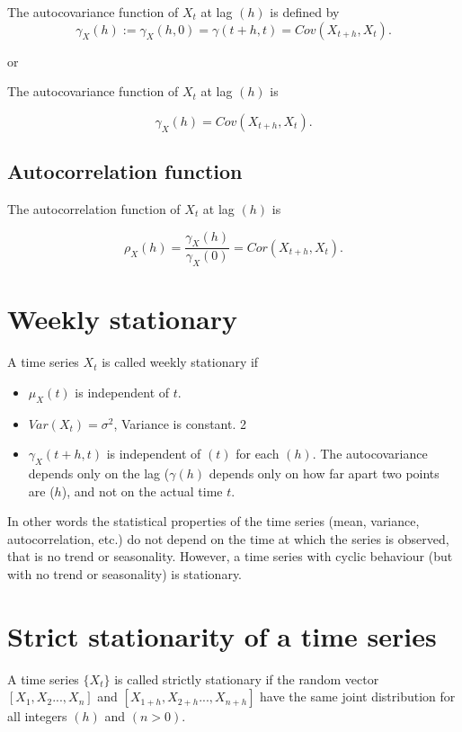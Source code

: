 \documentclass[
  11pt,
  a4paper,
]{report}
\begin{document}
The autocovariance function of \({X_t}\) at lag \((h)\) is defined by
\[\gamma_X(h):=\gamma_X(h, 0)=\gamma(t+h, t)=Cov(X_{t+h}, X_t).\]

or

The autocovariance function of \({X_t}\) at lag \((h)\) is

\[\gamma_X(h)=Cov(X_{t+h}, X_t).\]

\subsection{Autocorrelation function}\label{autocorrelation-function}

The autocorrelation function of \({X_t}\) at lag \((h)\) is

\[\rho_X(h)=\frac{\gamma_X(h)}{\gamma_X(0)}=Cor(X_{t+h}, X_t).\]

\section{Weekly stationary}\label{weekly-stationary}

A time series \({X_t}\) is called weekly stationary if

\begin{itemize}
\item
  \(\mu_X(t)\) is independent of \(t\).
\item
  \(Var(X_t) = \sigma^2\), Variance is constant. 2
\item
  \(\gamma_X(t+h, t)\) is independent of \((t)\) for each \((h)\). The
  autocovariance depends only on the lag (\(\gamma(h)\) depends only on
  how far apart two points are (\(h\)), and not on the actual time
  \(t\).
\end{itemize}

In other words the statistical properties of the time series (mean,
variance, autocorrelation, etc.) do not depend on the time at which the
series is observed, that is no trend or seasonality. However, a time
series with cyclic behaviour (but with no trend or seasonality) is
stationary.

\section{Strict stationarity of a time
series}\label{strict-stationarity-of-a-time-series}

A time series \(\{X_t\}\) is called strictly stationary if the random
vector \([X_1, X_2..., X_n]\) and \([X_{1+h}, X_{2+h}..., X_{n+h}]\)
have the same joint distribution for all integers \((h)\) and
\((n > 0)\).
\end{document}
